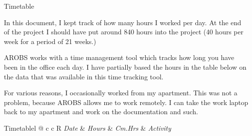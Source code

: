 \documentclass{matthijs}
\begin{document}
	\begin{hoofdstuk}{Timetable}

		In this document, I kept track of how many hours I worked per day.
		At the end of the project I should have put around 840 hours into the project (40 hours per week for a period of 21 weeks.)
		
		\bigskip

		AROBS works with a time management tool which tracks how long you have been in the office each day.
		I have partially based the hours in the table below on the data that was available in this time tracking tool.
		
		\bigskip

		For various reasons, I occasionally worked from my apartment.
		This was not a problem, because AROBS allows me to work remotely.
		I can take the work laptop back to my apartment and work on the documentation and such.

		\bigskip

		\begin{tabel}{Timetable}{l @{\extracolsep{\fill}} c c R}
			\emph{Date} & \emph{Hours} & \emph{Cm.Hrs} & \emph{Activity} \\
			\midrule


\end{tabel}
\end{hoofdstuk}
\end{document}
